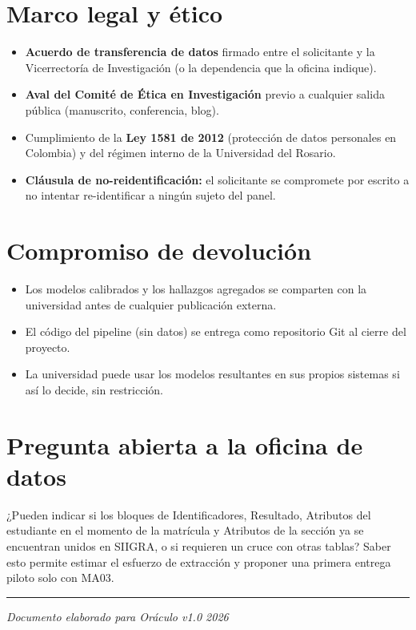 \documentclass[11pt,a4paper]{article}
\begin{document}
\section{Marco legal y ético}

\begin{itemize}
\item \textbf{Acuerdo de transferencia de datos} firmado entre el solicitante y la Vicerrectoría de Investigación (o la dependencia que la oficina indique).
\item \textbf{Aval del Comité de Ética en Investigación} previo a cualquier salida pública (manuscrito, conferencia, blog).
\item Cumplimiento de la \textbf{Ley 1581 de 2012} (protección de datos personales en Colombia) y del régimen interno de la Universidad del Rosario.
\item \textbf{Cláusula de no-reidentificación:} el solicitante se compromete por escrito a no intentar re-identificar a ningún sujeto del panel.
\end{itemize}

\section{Compromiso de devolución}

\begin{itemize}
\item Los modelos calibrados y los hallazgos agregados se comparten con la universidad antes de cualquier publicación externa.
\item El código del pipeline (sin datos) se entrega como repositorio Git al cierre del proyecto.
\item La universidad puede usar los modelos resultantes en sus propios sistemas si así lo decide, sin restricción.
\end{itemize}

\section{Pregunta abierta a la oficina de datos}

¿Pueden indicar si los bloques de Identificadores, Resultado, Atributos del estudiante en el momento de la matrícula y Atributos de la sección ya se encuentran unidos en SIIGRA, o si requieren un cruce con otras tablas? Saber esto permite estimar el esfuerzo de extracción y proponer una primera entrega piloto solo con MA03.

\vspace{1.5em}
\noindent\textcolor{rule}{\rule{\linewidth}{0.6pt}}
\vspace{0.4em}

\begin{flushright}
\footnotesize\itshape Documento elaborado para Oráculo \textbar{} v1.0 \textbar{} 2026
\end{flushright}
\end{document}
